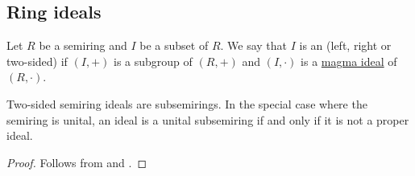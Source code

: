 \subsection{Ring ideals}\label{subsec:ring_ideals}

\begin{definition}\label{def:semiring_ideal}
  Let \( R \) be a semiring and \( I \) be a subset of \( R \). We say that \( I \) is an  (left, right or two-sided) if \( (I, +) \) is a subgroup of \( (R, +) \) and \( (I, \cdot) \) is a \hyperref[def:magma_ideal]{magma ideal} of \( (R, \cdot) \).
\end{definition}

\begin{proposition}\label{thm:semiring_ideal_is_nonunital_subsemiring}
  Two-sided semiring ideals are subsemirings. In the special case where the semiring is unital, an ideal is a unital subsemiring if and only if it is not a proper ideal.
\end{proposition}
\begin{proof}
  Follows from  and .
\end{proof}

